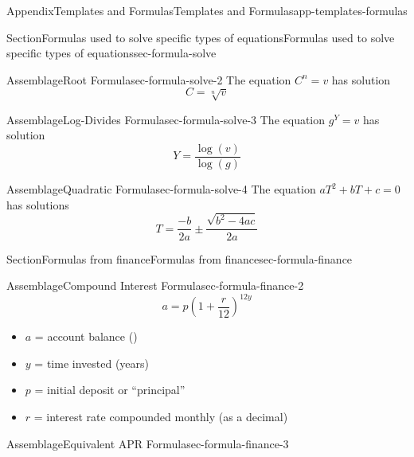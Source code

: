 \documentclass[twoside,11pt,]{book}
\numberwithin{equation}{section}
\begin{document}
\begin{appendixptx}{Appendix}{Templates and Formulas}{}{Templates and Formulas}{}{}{app-templates-formulas}
%
\begin{sectionptx}{Section}{Formulas used to solve specific types of equations}{}{Formulas used to solve specific types of equations}{}{}{sec-formula-solve}
\begin{assemblage}{Assemblage}{Root Formula}{sec-formula-solve-2}%
The equation \(C^n=v\) has solution%
\begin{equation*}
C= \sqrt[n]{v}
\end{equation*}
%
\end{assemblage}
\begin{assemblage}{Assemblage}{Log-Divides Formula}{sec-formula-solve-3}%
The equation \(g^Y = v\) has solution%
\begin{equation*}
Y = \frac{\log (v)}{\log(g)}
\end{equation*}
%
\end{assemblage}
\begin{assemblage}{Assemblage}{Quadratic Formula}{sec-formula-solve-4}%
The equation \(aT^2+bT+c=0\) has solutions%
\begin{equation*}
T = \frac{-b}{2a} \pm \frac{\sqrt{b^2-4ac}}{2a}
\end{equation*}
%
\end{assemblage}
\end{sectionptx}
%
%
\typeout{************************************************}
\typeout{************************************************}
%
\begin{sectionptx}{Section}{Formulas from finance}{}{Formulas from finance}{}{}{sec-formula-finance}
\begin{assemblage}{Assemblage}{Compound Interest Formula}{sec-formula-finance-2}%
%
\begin{equation*}
a = p \left( 1 + \frac{r}{12}\right) ^{12y}
\end{equation*}
%
\begin{itemize}[label=\textbullet]
\item{}\(a\) = account balance (\textdollar{})%
\item{}\(y\) = time invested (years)%
\item{}\(p\) = initial deposit or ``principal''%
\item{}\(r\) = interest rate compounded monthly (as a decimal)%
\end{itemize}
%
\end{assemblage}
\begin{assemblage}{Assemblage}{Equivalent APR Formula}{sec-formula-finance-3}%
%
\begin{equation*}

\end{equation*}
\end{assemblage}
\end{sectionptx}
\end{appendixptx}
\end{document}
